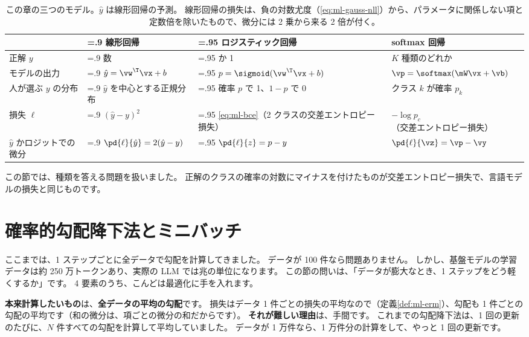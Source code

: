 \begin{table}[tbp]
\centering
\caption{この章の三つのモデル。$\hat{y}$ は線形回帰の予測。
線形回帰の損失は、負の対数尤度（\eqref{eq:ml-gauss-nll}）から、パラメータに関係しない項と定数倍を除いたもので、微分には 2 乗から来る 2 倍が付く。}
\label{tab:ml-reg-vs-cls}
\small
\begin{tabularx}{\linewidth}{l>{\hsize=.9\hsize}X>{\hsize=.95\hsize}X>{\hsize=1.15\hsize}X}
\toprule
 & 線形回帰 & ロジスティック回帰 & softmax 回帰 \\
\midrule
正解 $y$ & 数 & 0 か 1 & $K$ 種類のどれか \\
モデルの出力 & $\hat{y}=\vw^\T\vx+b$ & $p=\sigmoid(\vw^\T\vx+b)$ & \mbox{$\vp=\softmax(\mW\vx+\vb)$} \\
人が選ぶ $y$ の分布 & $\hat{y}$ を中心とする正規分布 & 確率 $p$ で 1、$1-p$ で 0 & クラス $k$ が確率 $p_k$ \\
損失 $\ell$ & $(\hat{y}-y)^2$ & \eqref{eq:ml-bce}（2 クラスの交差エントロピー損失） & $-\log p_c$（交差エントロピー損失） \\
$\hat{y}$ かロジットでの微分 & $\pd{\ell}{\hat{y}}=2(\hat{y}-y)$ & $\pd{\ell}{z}=p-y$ & $\pd{\ell}{\vz}=\vp-\vy$ \\
\bottomrule
\end{tabularx}
\end{table}

この節では、種類を答える問題を扱いました。
正解のクラスの確率の対数にマイナスを付けたものが交差エントロピー損失で、言語モデルの損失と同じものです。

\section{確率的勾配降下法とミニバッチ}\label{sec:ml-sgd}

ここまでは、1 ステップごとに全データで勾配を計算してきました。
データが 100 件なら問題ありません。
しかし、基盤モデルの学習データは約 250 万トークンあり、実際の LLM では兆の単位になります。
この節の問いは、「データが膨大なとき、1 ステップをどう軽くするか」です。
4 要素のうち、こんどは最適化に手を入れます。

\textbf{本来計算したいもの}は、\textbf{全データの平均の勾配}です。
損失はデータ 1 件ごとの損失の平均なので（定義\ref{def:ml-erm}）、勾配も 1 件ごとの勾配の平均です（和の微分は、項ごとの微分の和だからです）。
\textbf{それが難しい理由}は、手間です。
これまでの勾配降下法は、1 回の更新のたびに、$N$ 件すべての勾配を計算して平均していました。
データが 1 万件なら、1 万件分の計算をして、やっと 1 回の更新です。

